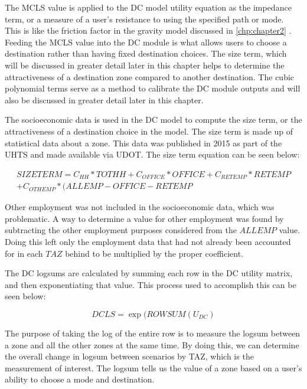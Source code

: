 The MCLS value is applied to the DC model utility equation as the impedance
term, or a measure of
a user’s resistance to using the specified path or mode. This is like the
friction factor in the
gravity model discussed in \ref{chp:chapter2} . Feeding the MCLS value into
the DC module is what allows
users to choose a destination rather than having fixed destination choices.
The size term, which
will be discussed in greater detail later in this chapter helps to determine
the attractiveness
of a destination zone compared to another destination. The cubic polynomial
terms serve as a
method to calibrate the DC module outputs and will also be discussed in
greater detail later in
this chapter.

The socioeconomic data is used in the DC model to compute the size term, or
the attractiveness of
a destination choice in the model. The size term is made up of statistical
data about a zone.
This data was published in 2015 as part of the UHTS and made available via
UDOT. The size term
equation can be seen below:

\begin{equation}
\begin{aligned}
	SIZETERM = C_{HH} * TOTHH + C_{OFFICE} * OFFICE + C_{RETEMP} * RETEMP\\ + C_{OTHEMP} * (ALLEMP - OFFICE - RETEMP
	\label{sizeterm}
\end{aligned}
\end{equation}

Other employment was not included in the socioeconomic data, which was
problematic. A way to
determine a value for other employment was found by subtracting the other
employment purposes
considered from the $ALLEMP$ value. Doing this left only the employment data
that had not already
been accounted for in each $TAZ$ behind to be multiplied by the proper
coefficient.

The DC logsums are calculated by summing each row in the DC utility matrix,
and then
exponentiating that value. This process used to accomplish this can be seen
below:

\begin{equation}
DCLS = \exp (ROWSUM(U_{DC})
	\label{eqn:dcls}
\end{equation}

The purpose of taking the log of the entire row is to measure the logsum
between a zone and all
the other zones at the same time. By doing this, we can determine the overall
change in logsum
between scenarios by TAZ, which is the measurement of interest. The logsum
tells us the value of
a zone based on a user’s ability to choose a mode and destination.

